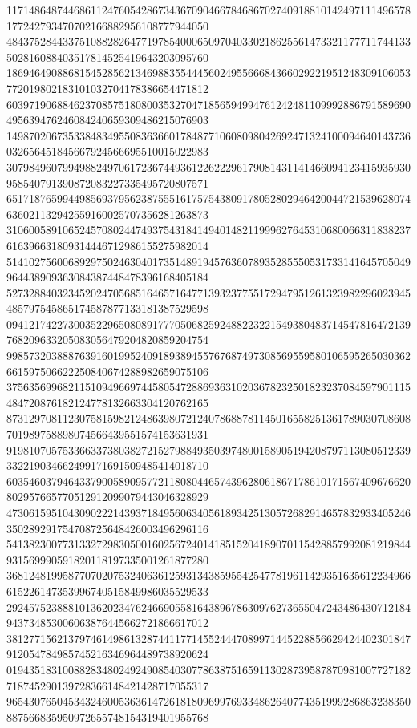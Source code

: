 \begin{DoxyCode}
      117148648744686112476054286734367090466784686702740918810142497111496578177242793470702166882956108777944050
      484375284433751088282647719785400065097040330218625561473321177711744133502816088403517814525419643203095760
      186946490886815452856213469883554445602495566684366029221951248309106053772019802183101032704178386654471812
      603971906884623708575180800353270471856594994761242481109992886791589690495639476246084240659309486215076903
      149870206735338483495508363660178487710608098042692471324100094640143736032656451845667924566695510015022983
      307984960799498824970617236744936122622296179081431141466094123415935930958540791390872083227335495720807571
      651718765994498569379562387555161757543809178052802946420044721539628074636021132942559160025707356281263873
      310600589106524570802447493754318414940148211999627645310680066311838237616396631809314446712986155275982014
      514102756006892975024630401735148919457636078935285550531733141645705049964438909363084387448478396168405184
      527328840323452024705685164657164771393237755172947951261323982296023945485797545865174587877133181387529598
      094121742273003522965080891777050682592488223221549380483714547816472139768209633205083056479204820859204754
      998573203888763916019952409189389455767687497308569559580106595265030362661597506622250840674288982659075106
      375635699682115109496697445805472886936310203678232501823237084597901115484720876182124778132663304120762165
      873129708112307581598212486398072124078688781145016558251361789030708608701989758898074566439551574153631931
      919810705753366337380382721527988493503974800158905194208797113080512339332219034662499171691509485414018710
      603546037946433790058909577211808044657439628061867178610171567409676620802957665770512912099079443046328929
      473061595104309022214393718495606340561893425130572682914657832933405246350289291754708725648426003496296116
      541382300773133272983050016025672401418515204189070115428857992081219844931569990591820118197335001261877280
      368124819958770702075324063612593134385955425477819611429351635612234966615226147353996740515849986035529533
      292457523888101362023476246690558164389678630976273655047243486430712184943734853006063876445662721866617012
      381277156213797461498613287441177145524447089971445228856629424402301847912054784985745216346964489738920624
      019435183100882834802492490854030778638751659113028739587870981007727182718745290139728366148421428717055317
      965430765045343246005363614726181809699769334862640774351999286863238350887566835950972655748154319401955768

\end{DoxyCode}
